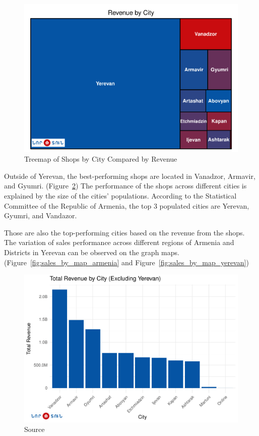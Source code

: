 \documentclass[conference]{IEEEtran}
\begin{document}
\begin{figure}[htbp]
\centering
\includegraphics[width=\columnwidth,keepaspectratio]{./figures/treemap_whole.pdf}
\caption{Treemap of Shops by City Compared by Revenue \cite{treemap}}
\label{fig:treemap_whole}
\end{figure}

Outside of Yerevan, the best-performing shops are located in Vanadzor, Armavir, and Gyumri. (Figure~\ref{fig:sales_by_city}) The performance of the shops across different cities is explained by the size of the cities' populations. According to the Statistical Committee of the Republic of Armenia, the top 3 populated cities are Yerevan, Gyumri, and Vandazor. \cite{armstat2015}




Those are also the top-performing cities based on the revenue from the shops. The variation of sales performance across different regions of Armenia and Districts in Yerevan can be observed on the graph maps. (Figure~\ref{fig:sales_by_map_armenia} and Figure~\ref{fig:sales_by_map_yerevan}) 

\begin{figure}[htbp]
\centering
\includegraphics[width=\columnwidth,keepaspectratio]{./figures/sales_by_city.pdf}
\caption{Source \cite{SalesWithoutYerevan}}
\label{fig:sales_by_city}
\end{figure}
\end{document}
